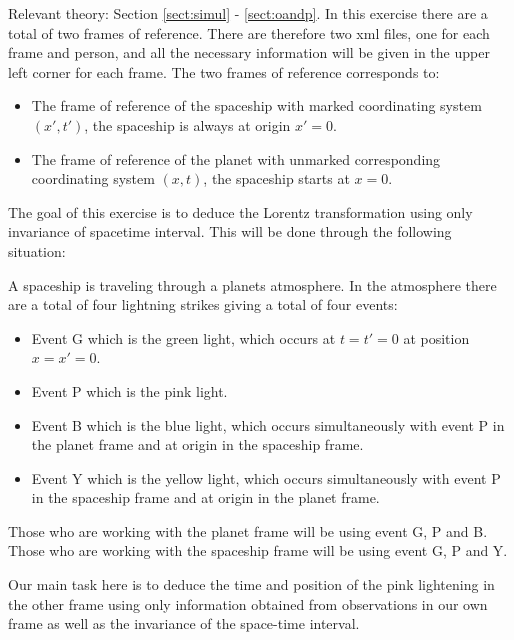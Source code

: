 {\begin{multicols}{2}
\vspace{0.5cm}


Relevant theory: Section \ref{sect:simul} - \ref{sect:oandp}.\newline
In this exercise there are a total of two frames of reference. There are therefore two xml files, one for each frame and person, and all the necessary information will be given in the upper left corner for each frame. The two frames of reference corresponds to:
\begin{itemize}
\item The frame of reference of the spaceship with marked coordinating system $(x',t')$, the spaceship is always at origin $x'=0$.
\item The frame of reference of the planet with unmarked corresponding coordinating system $(x,t)$, the spaceship starts at $x=0$.
\end{itemize}

The goal of this exercise is to deduce the Lorentz transformation using only invariance of spacetime interval. This will be done through the following situation:

A spaceship is traveling through a planets atmosphere. In the atmosphere there are a total of four lightning strikes giving a total of four events:
\begin{itemize}
\item Event G which is the green light, which occurs at $t=t'=0$ at position $x=x'=0$.
\item Event P which is the pink light.
\item Event B which is the blue light, which occurs simultaneously with event P in the planet frame and at origin in the spaceship frame.
\item Event Y which is the yellow light, which occurs simultaneously with event P in the spaceship frame and at origin in the planet frame.
\end{itemize}
Those who are working with the planet frame will be using event G, P and B. Those who are working with the spaceship frame will be using event G, P and Y.

Our main task here is to deduce the time and position of the pink lightening in the other frame using only information obtained from observations in our own frame as well as the invariance of the space-time interval.


\end{multicols}}
